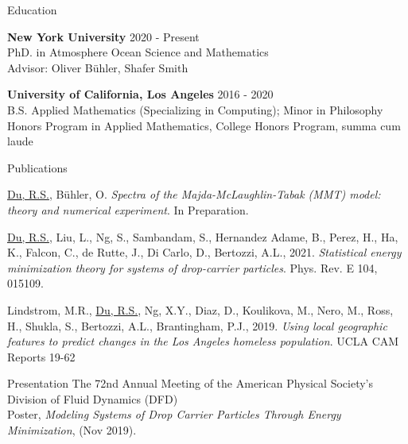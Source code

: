\documentclass{resume} %
\begin{document}

\begin{rSection}{Education}

{\bf New York University} \hfill {2020 - Present} \\
PhD. in Atmosphere Ocean Science and Mathematics\\
Advisor: Oliver B\"uhler, Shafer Smith

{\bf University of California, Los Angeles} \hfill {2016 - 2020} \\
B.S. Applied Mathematics (Specializing in Computing); Minor in Philosophy\\
Honors Program in Applied Mathematics, College Honors Program, summa cum laude

\end{rSection}


\begin{rSection}{Publications}
\begin{etaremune}
    \item \underline{Du, R.S.}, B\"uhler, O. \textit{Spectra of the Majda-McLaughlin-Tabak (MMT) model: theory and numerical experiment}. In Preparation.
    \item \underline{Du, R.S.}, Liu, L., Ng, S., Sambandam, S., Hernandez Adame, B., Perez, H., Ha, K., Falcon, C., de Rutte, J., Di Carlo, D., Bertozzi, A.L., 2021. \textit{Statistical energy minimization theory for systems of drop-carrier particles}. Phys. Rev. E 104, 015109.
    \item Lindstrom, M.R., \underline{Du, R.S.}, Ng, X.Y., Diaz, D., Koulikova, M., Nero, M., Ross, H., Shukla, S., Bertozzi, A.L., Brantingham, P.J., 2019. \textit{Using local geographic features to predict changes in the Los Angeles homeless population}. UCLA CAM Reports 19-62
\end{etaremune}
\end{rSection}


\begin{rSection}{Presentation}
The 72nd Annual Meeting of the American Physical Society's Division of Fluid Dynamics (DFD)\\
Poster, \textit{Modeling Systems of Drop Carrier Particles Through Energy Minimization},  (Nov 2019).
\end{rSection}
\end{document}

